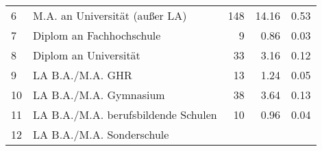 \begin{longtable}{lXrrr}
     6 &
     \multicolumn{1}{X}{ M.A. an Universität (außer LA)   } &


       \num{148} &
       \num[round-mode=places,round-precision=2]{14,16} &
         \num[round-mode=places,round-precision=2]{0,53} \\

     7 &
     \multicolumn{1}{X}{ Diplom an Fachhochschule   } &


       \num{9} &
       \num[round-mode=places,round-precision=2]{0,86} &
         \num[round-mode=places,round-precision=2]{0,03} \\

     8 &
     \multicolumn{1}{X}{ Diplom an Universität   } &


       \num{33} &
       \num[round-mode=places,round-precision=2]{3,16} &
         \num[round-mode=places,round-precision=2]{0,12} \\

     9 &
     \multicolumn{1}{X}{ LA B.A./M.A. GHR   } &


       \num{13} &
       \num[round-mode=places,round-precision=2]{1,24} &
         \num[round-mode=places,round-precision=2]{0,05} \\

     10 &
     \multicolumn{1}{X}{ LA B.A./M.A. Gymnasium   } &


       \num{38} &
       \num[round-mode=places,round-precision=2]{3,64} &
         \num[round-mode=places,round-precision=2]{0,13} \\

     11 &
     \multicolumn{1}{X}{ LA B.A./M.A. berufsbildende Schulen   } &


       \num{10} &
       \num[round-mode=places,round-precision=2]{0,96} &
         \num[round-mode=places,round-precision=2]{0,04} \\

     12 &
     \multicolumn{1}{X}{ LA B.A./M.A. Sonderschule   } &



\end{longtable}
